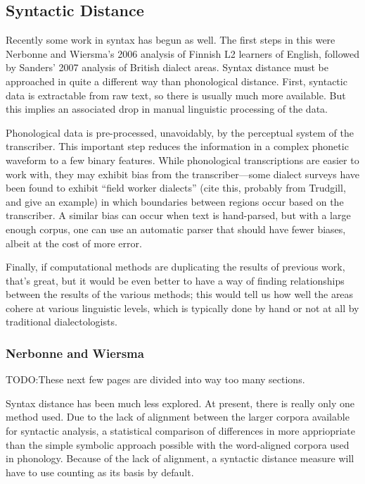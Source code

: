 \documentclass[11pt]{article}
\begin{document}
\subsection{Syntactic  Distance}
Recently some work in syntax has begun as well. The first steps in
this were Nerbonne and Wiersma's 2006 analysis of Finnish L2 learners
of English, followed by Sanders' 2007 analysis of British dialect
areas. Syntax distance must be approached in quite a different way than
phonological distance. First, syntactic data is extractable from raw
text, so there is usually much more available. But this implies an
associated drop in manual linguistic processing of the
data.

Phonological data is pre-processed, unavoidably, by the perceptual
system of the transcriber. This important step reduces the information
in a complex phonetic waveform to a few binary features. While
phonological transcriptions are easier to work with, they may exhibit bias
from the transcriber---some dialect surveys have been found to exhibit
``field worker dialects'' (cite this, probably from Trudgill, and give
an example) in which
boundaries between regions occur based on the transcriber. A
similar bias can occur when text is hand-parsed, but with a
large enough corpus, one can use an automatic parser that should have
fewer biases, albeit at the cost of more error.

Finally, if computational methods are duplicating the results of
previous work, that's great, but it would be even better to have a
way of finding relationships between
the results of the various methods; this would tell us how well the
areas cohere at various linguistic levels, which is typically done by
hand or not at all by traditional dialectologists.

\subsubsection{Nerbonne and Wiersma}
\label{nerbonne06}
TODO:These next few pages are divided into way too many sections.

Syntax distance has been much less explored. At present, there is
really only one method used. Due to the lack of alignment between the
larger corpora available for syntactic analysis, a statistical
comparison of differences in more appriopriate than the simple
symbolic approach possible with the word-aligned corpora used in
phonology. Because of the lack of alignment, a syntactic distance
measure will have to use counting as its basis by default.
\end{document}
